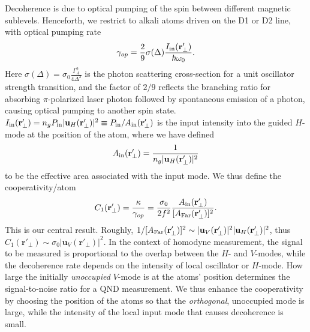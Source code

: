 \documentclass[aps,pra,twocolumn,superscriptaddress]{revtex4-1} %
\newcommand{\mbf}[1]{\mathbf{#1}}
\newcommand{\AF}{A_{\rm Far}} %
\newcommand{\Ai}{A_{\rm in}} %
\begin{document}
Decoherence is due to optical pumping of the spin between different magnetic sublevels.  Henceforth, we restrict to alkali atoms driven on the D1 or D2 line, with optical pumping rate 
\begin{equation}
\gamma_{op} =\frac{2}{9} \sigma(\Delta) \frac{I_{\rm in}(\mbf{r}'_\perp)}{\hbar \omega_0}.
\end{equation}
Here $\sigma(\Delta) = \sigma_0 \frac{\Gamma_A^2}{4 \Delta^2}$ is the photon scattering cross-section for a unit oscillator strength transition, and the factor of $2/9$ reflects the branching ratio for absorbing $\pi$-polarized laser photon followed by spontaneous emission of a photon, causing optical pumping to another spin state. $I_{\rm in}(\mbf{r}'_\perp) = n_g P_{\rm in}\vert \mbf{u}_H (\mbf{r}'_\perp)  \vert^2 \equiv P_{\rm in}/\Ai(\mbf{r}'_\perp) $ is the input intensity into the guided $H$-mode at the position of the atom,  where we have defined
\begin{equation}\label{eq:Ain}
\Ai(\mbf{r}'_\perp) =  \frac{1}{n_g \vert \mbf{u}_H (\mbf{r}'_\perp) \vert ^2}
\end{equation}
to be the effective area associated with the input mode.  We thus define the cooperativity/atom
\begin{equation}\label{eq:C1}
C_1 (\mbf{r}'_\perp)  = \frac{\kappa}{\gamma_{op}} =\frac{\sigma_0}{2f^2} \frac{  \Ai(\mbf{r}'_\perp) }{[\AF(\mbf{r}'_\perp)]^2}.
\end{equation}
This is our central result.  Roughly, $1/[\AF(\mbf{r}'_\perp)]^2 \sim \vert \mbf{u}_V (\mbf{r}'_\perp) \vert ^2 \vert \mbf{u}_H (\mbf{r}'_\perp) \vert ^2$, thus $ C_1(\mbf{r}'_\perp) \sim \sigma_0 \vert \mbf{u}_V (\mbf{r}'_\perp) \vert ^2$. In the context of homodyne measurement, the signal to be measured is proportional to the overlap between the $ H $- and $ V $-modes, while the decoherence rate depends on the intensity of local oscillator or $ H $-mode. How large the initially {\em unoccupied} $ V $-mode is at the atoms' position determines the signal-to-noise ratio for a QND measurement.  We thus enhance the cooperativity by choosing the position of the atoms so that the {\em orthogonal}, unoccupied mode is large, while the intensity of the local input mode that causes decoherence is small.
\end{document}
